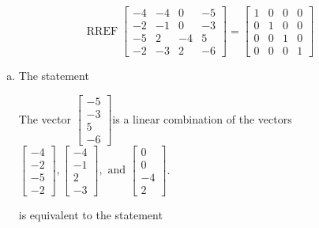 \begin{exerciseAnswer} 
\[\operatorname{RREF}  \left[\begin{array}{ccc|c}
-4 & -4 & 0 & -5 \\
-2 & -1 & 0 & -3 \\
-5 & 2 & -4 & 5 \\
-2 & -3 & 2 & -6
\end{array}\right] = \left[\begin{array}{ccc|c}
1 & 0 & 0 & 0 \\
0 & 1 & 0 & 0 \\
0 & 0 & 1 & 0 \\
0 & 0 & 0 & 1
\end{array}\right] \]
\begin{enumerate}[(a)]
\item  The statement 
\begin{center}\begin{minipage}{0.8\textwidth}
 The vector \( \left[\begin{array}{c}
-5 \\
-3 \\
5 \\
-6
\end{array}\right] \)is a linear combination of the vectors \( \left[\begin{array}{c}
-4 \\
-2 \\
-5 \\
-2
\end{array}\right] , \left[\begin{array}{c}
-4 \\
-1 \\
2 \\
-3
\end{array}\right] , \text{ and } \left[\begin{array}{c}
0 \\
0 \\
-4 \\
2
\end{array}\right] \). 
\end{minipage}\end{center}
     is equivalent to the statement 
\begin{center}\begin{minipage}{0.8\textwidth}
 The vector equation \( x_{1} \left[\begin{array}{c}
-4 \\
-2 \\
-5 \\

\end{array}
\end{minipage}
\end{center}
\end{enumerate}
\end{exerciseAnswer}
